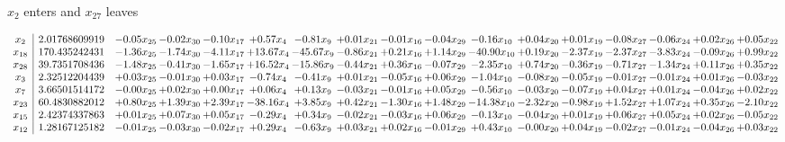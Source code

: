 \documentclass[9pt]{article}
\begin{document}
 $ x_{2} $ enters and $ x_{27} $ leaves 

 \[\begin{array}{c| c c@{\hskip 2pt} c@{\hskip 2pt} c@{\hskip 2pt} c@{\hskip 2pt} c@{\hskip 2pt} c@{\hskip 2pt} c@{\hskip 2pt} c@{\hskip 2pt} c@{\hskip 2pt} c@{\hskip 2pt} c@{\hskip 2pt} c@{\hskip 2pt} c@{\hskip 2pt} c@{\hskip 2pt} c@{\hskip 2pt} }
 x_{2}   &  2.01768609919 & -0.05 x_{25} & -0.02 x_{30} & -0.10 x_{17} & +  0.57 x_{4} & -0.81 x_{9} & +  0.01 x_{21} & -0.01 x_{16} & -0.04 x_{29} & -0.16 x_{10} & +  0.04 x_{20} & +  0.01 x_{19} & -0.08 x_{27} & -0.06 x_{24} & +  0.02 x_{26} & +  0.05 x_{22}\\
 x_{18}   &  170.435242431 & -1.36 x_{25} & -1.74 x_{30} & -4.11 x_{17} & + 13.67 x_{4} & -45.67 x_{9} & -0.86 x_{21} & +  0.21 x_{16} & +  1.14 x_{29} & -40.90 x_{10} & +  0.19 x_{20} & -2.37 x_{19} & -2.37 x_{27} & -3.83 x_{24} & -0.09 x_{26} & +  0.99 x_{22}\\
 x_{28}   &  39.7351708436 & -1.48 x_{25} & -0.41 x_{30} & -1.65 x_{17} & + 16.52 x_{4} & -15.86 x_{9} & -0.44 x_{21} & +  0.36 x_{16} & -0.07 x_{29} & -2.35 x_{10} & +  0.74 x_{20} & -0.36 x_{19} & -0.71 x_{27} & -1.34 x_{24} & +  0.11 x_{26} & +  0.35 x_{22}\\
 x_{3}   &  2.32512204439 & +  0.03 x_{25} & -0.01 x_{30} & +  0.03 x_{17} & -0.74 x_{4} & -0.41 x_{9} & +  0.01 x_{21} & -0.05 x_{16} & +  0.06 x_{29} & -1.04 x_{10} & -0.08 x_{20} & -0.05 x_{19} & -0.01 x_{27} & -0.01 x_{24} & +  0.01 x_{26} & -0.03 x_{22}\\
 x_{7}   &  3.66501514172 & -0.00 x_{25} & +  0.02 x_{30} & +  0.00 x_{17} & +  0.06 x_{4} & +  0.13 x_{9} & -0.03 x_{21} & -0.01 x_{16} & +  0.05 x_{29} & -0.56 x_{10} & -0.03 x_{20} & -0.07 x_{19} & +  0.04 x_{27} & +  0.01 x_{24} & -0.04 x_{26} & +  0.02 x_{22}\\
 x_{23}   &  60.4830882012 & +  0.80 x_{25} & +  1.39 x_{30} & +  2.39 x_{17} & -38.16 x_{4} & +  3.85 x_{9} & +  0.42 x_{21} & -1.30 x_{16} & +  1.48 x_{29} & -14.38 x_{10} & -2.32 x_{20} & -0.98 x_{19} & +  1.52 x_{27} & +  1.07 x_{24} & +  0.35 x_{26} & -2.10 x_{22}\\
 x_{15}   &  2.42374337863 & +  0.01 x_{25} & +  0.07 x_{30} & +  0.05 x_{17} & -0.29 x_{4} & +  0.34 x_{9} & -0.02 x_{21} & -0.03 x_{16} & +  0.06 x_{29} & -0.13 x_{10} & -0.04 x_{20} & +  0.01 x_{19} & +  0.06 x_{27} & +  0.05 x_{24} & +  0.02 x_{26} & -0.05 x_{22}\\
 x_{12}   &  1.28167125182 & -0.01 x_{25} & -0.03 x_{30} & -0.02 x_{17} & +  0.29 x_{4} & -0.63 x_{9} & +  0.03 x_{21} & +  0.02 x_{16} & -0.01 x_{29} & +  0.43 x_{10} & -0.00 x_{20} & +  0.04 x_{19} & -0.02 x_{27} & -0.01 x_{24} & -0.04 x_{26} & +  0.03 x_{22}\\

\end{array}\]
\end{document}
